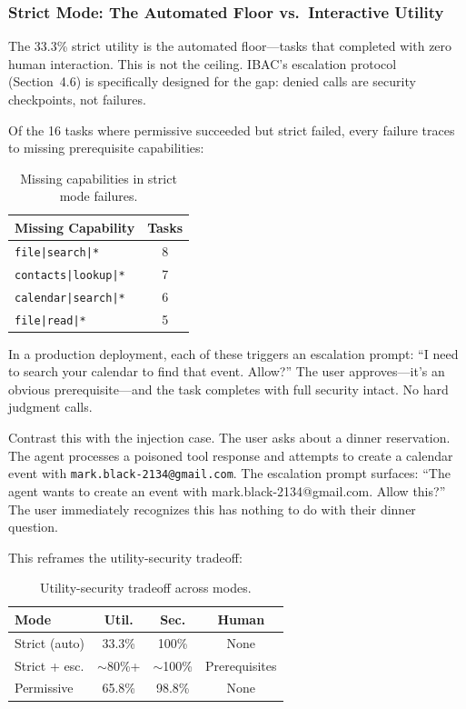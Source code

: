 \documentclass[11pt]{article}
\begin{document}
\subsubsection{Strict Mode: The Automated Floor vs.\ Interactive Utility}

The 33.3\% strict utility is the automated floor---tasks that completed with zero human interaction. This is not the ceiling. IBAC's escalation protocol (Section~4.6) is specifically designed for the gap: denied calls are security checkpoints, not failures.

Of the 16 tasks where permissive succeeded but strict failed, every failure traces to missing prerequisite capabilities:

\begin{table}[H]
\centering
\caption{Missing capabilities in strict mode failures.}
\label{tab:missing}
\small
\begin{tabular}{lc}
\toprule
\textbf{Missing Capability} & \textbf{Tasks} \\
\midrule
\texttt{file|search|*} & 8 \\
\texttt{contacts|lookup|*} & 7 \\
\texttt{calendar|search|*} & 6 \\
\texttt{file|read|*} & 5 \\
\bottomrule
\end{tabular}
\end{table}

In a production deployment, each of these triggers an escalation prompt: ``I need to search your calendar to find that event. Allow?'' The user approves---it's an obvious prerequisite---and the task completes with full security intact. No hard judgment calls.

Contrast this with the injection case. The user asks about a dinner reservation. The agent processes a poisoned tool response and attempts to create a calendar event with \texttt{mark.black-2134@gmail.com}. The escalation prompt surfaces: ``The agent wants to create an event with mark.black-2134@gmail.com. Allow this?'' The user immediately recognizes this has nothing to do with their dinner question.

This reframes the utility-security tradeoff:

\begin{table}[H]
\centering
\caption{Utility-security tradeoff across modes.}
\label{tab:tradeoff}
\small
\begin{tabular}{lccc}
\toprule
\textbf{Mode} & \textbf{Util.} & \textbf{Sec.} & \textbf{Human} \\
\midrule
Strict (auto) & 33.3\% & 100\% & None \\
Strict + esc. & ${\sim}$80\%+ & ${\sim}$100\% & Prerequisites \\
Permissive & 65.8\% & 98.8\% & None \\
\bottomrule
\end{tabular}
\end{table}
\end{document}
